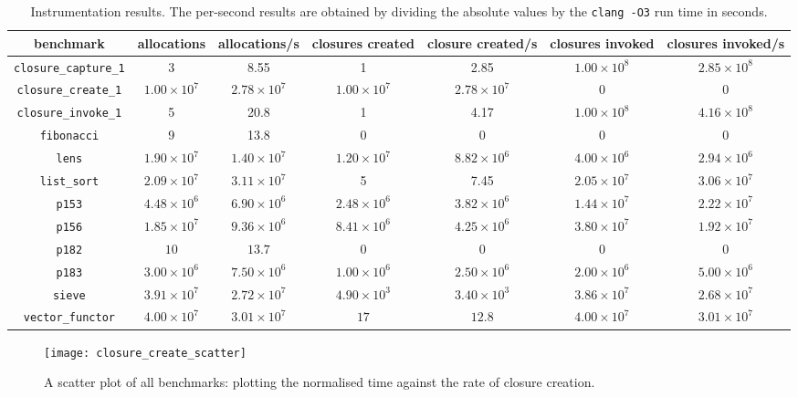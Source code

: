 \documentclass[12pt,a4paper,twoside,openright]{report}
\begin{document}
\begin{table}
  \tiny
  \centering
  \begin{tabular}{c | c c | c c | c c}

benchmark & allocations & allocations/s & closures created & closure created/s & closures invoked & closures invoked/s \\ \hline
\lstinline!closure_capture_1! & 3 & 8.55 & 1 & 2.85 & $1.00\times 10^8$ & $2.85\times 10^8$ \\
\lstinline!closure_create_1! & $1.00\times 10^7$ & $2.78\times 10^7$ & $1.00\times 10^7$ & $2.78\times 10^7$ & 0 & 0 \\
\lstinline!closure_invoke_1! & 5 & 20.8 & 1 & 4.17 & $1.00\times 10^8$ & $4.16\times 10^8$ \\
\lstinline!fibonacci! & 9 & 13.8 & 0 & 0 & 0 & 0 \\
\lstinline!lens! & $1.90\times 10^7$ & $1.40\times 10^7$ & $1.20\times 10^7$ & $8.82\times10^6$ & $4.00\times10^6$ & $2.94\times10^6$ \\
\lstinline!list_sort! & $2.09\times 10^7$ & $3.11\times10^7$ & 5 & 7.45 & $2.05\times 10^7$ & $3.06\times10^7$ \\
\lstinline!p153!           & $4.48\times10^6$ & $6.90\times10^6$ & $2.48\times10^6$ & $3.82\times10^6$ & $1.44\times10^7$ & $2.22\times10^7$ \\
\lstinline!p156!           & $1.85\times10^7$ & $9.36\times10^6$ & $8.41\times10^6$ & $4.25\times10^6$ & $3.80\times10^7$ & $1.92\times10^7$ \\
\lstinline!p182!           & $10$ & $13.7$ & $0$ & $0$ & $0$ & $0$ \\
\lstinline!p183!           & $3.00\times10^6$ & $7.50\times10^6$ & $1.00\times10^6$ & $2.50\times10^6$ & $2.00\times10^6$ & $5.00\times10^6$ \\
\lstinline!sieve!          & $3.91\times10^7$ & $2.72\times10^7$ & $4.90\times10^3$ & $3.40\times10^3$ & $3.86\times10^7$ & $2.68\times10^7$ \\
\lstinline!vector_functor! & $4.00\times10^7$ & $3.01\times10^7$ & $17$ & $12.8$ & $4.00\times10^7$ & $3.01\times10^7$
  \end{tabular}
  \caption{Instrumentation results. The per-second results are obtained by dividing the absolute values by the \lstinline!clang -O3! run time in seconds.}
  \label{tab-instrumentation}
\end{table}

\begin{figure}[h]
  \centering
  \texttt{[image: closure\_create\_scatter]}
  \caption{A scatter plot of all benchmarks: plotting the normalised time against the rate of closure creation.}
  \label{fig-closure-create-scatter}
\end{figure}
\end{document}

